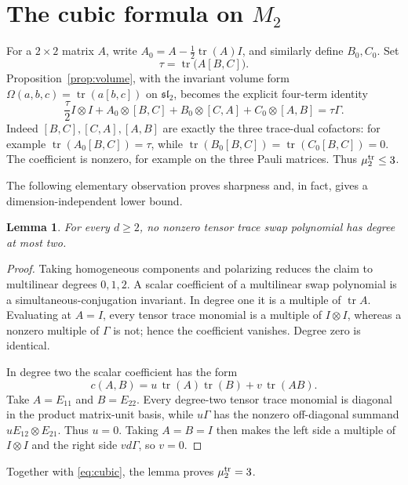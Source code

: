 \documentclass[11pt]{article}
\newtheorem{lemma}{Lemma}
\newcommand{\tr}{\operatorname{tr}}
\newcommand{\Id}{I}
\begin{document}
\section{The cubic formula on $M_2$}

For a $2\times2$ matrix $A$, write
$A_0=A-\tfrac12\tr(A)\Id$, and similarly define $B_0,C_0$.  Set
\[
                         \tau=\tr\bigl(A[B,C]\bigr).
\]
Proposition~\ref{prop:volume}, with the invariant volume form
$\Omega(a,b,c)=\tr(a[b,c])$ on $\mathfrak{sl}_2$, becomes the explicit
four-term identity
\begin{equation}\label{eq:cubic}
 \boxed{
 \frac{\tau}{2}\Id\otimes\Id
 +A_0\otimes[B,C]+B_0\otimes[C,A]+C_0\otimes[A,B]
 =\tau\Gamma.}
\end{equation}
Indeed $[B,C],[C,A],[A,B]$ are exactly the three trace-dual cofactors:
for example $\tr(A_0[B,C])=\tau$, while
$\tr(B_0[B,C])=\tr(C_0[B,C])=0$.  The coefficient is nonzero, for example
on the three Pauli matrices.  Thus $\mu_2^{\rm tr}\le3$.

The following elementary observation proves sharpness and, in fact, gives a
dimension-independent lower bound.

\begin{lemma}\label{lem:trace-lower}
For every $d\ge2$, no nonzero tensor trace swap polynomial has degree at most
two.
\end{lemma}

\begin{proof}
Taking homogeneous components and polarizing reduces the claim to multilinear
degrees $0,1,2$.  A scalar coefficient of a multilinear swap polynomial is a
simultaneous-conjugation invariant.  In degree one it is a multiple of
$\tr A$.  Evaluating at $A=\Id$, every tensor trace monomial is a multiple of
$\Id\otimes\Id$, whereas a nonzero multiple of $\Gamma$ is not; hence the
coefficient vanishes.  Degree zero is identical.

In degree two the scalar coefficient has the form
\[
 c(A,B)=u\,\tr(A)\tr(B)+v\,\tr(AB).
\]
Take $A=E_{11}$ and $B=E_{22}$.  Every degree-two tensor trace monomial is
diagonal in the product matrix-unit basis, while $u\Gamma$ has the nonzero
off-diagonal summand $uE_{12}\otimes E_{21}$.  Thus $u=0$.  Taking
$A=B=\Id$ then makes the left side a multiple of $\Id\otimes\Id$ and the
right side $vd\Gamma$, so $v=0$.
\end{proof}

Together with \eqref{eq:cubic}, the lemma proves
$\mu_2^{\rm tr}=3$.
\end{document}
